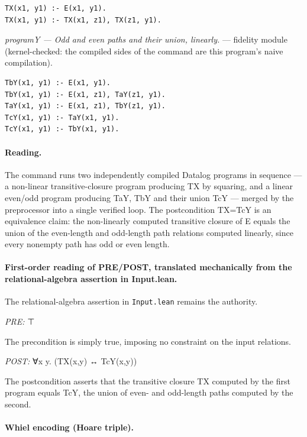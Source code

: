 \documentclass[10pt]{article}
\begin{document}
\begin{Verbatim}[fontsize=\scriptsize,breaklines=true,breakanywhere=true,frame=single,framesep=1.5mm]
TX(x1, y1) :- E(x1, y1).
TX(x1, y1) :- TX(x1, z1), TX(z1, y1).
\end{Verbatim}

{\raggedright\textit{programY --- Odd and even paths and their union, linearly.} --- fidelity module (kernel-checked: the compiled sides of the command are this program's naive compilation).\par}

\begin{Verbatim}[fontsize=\scriptsize,breaklines=true,breakanywhere=true,frame=single,framesep=1.5mm]
TbY(x1, y1) :- E(x1, y1).
TbY(x1, y1) :- E(x1, z1), TaY(z1, y1).
TaY(x1, y1) :- E(x1, z1), TbY(z1, y1).
TcY(x1, y1) :- TaY(x1, y1).
TcY(x1, y1) :- TbY(x1, y1).
\end{Verbatim}

\paragraph{Reading.} The command runs two independently compiled Datalog programs in sequence --- a non-linear transitive-closure program producing TX by squaring, and a linear even/odd program producing TaY, TbY and their union TcY --- merged by the preprocessor into a single verified loop. The postcondition TX=TcY is an equivalence claim: the non-linearly computed transitive closure of E equals the union of the even-length and odd-length path relations computed linearly, since every nonempty path has odd or even length.

\paragraph{First-order reading of PRE/POST, translated mechanically from the relational-algebra assertion in Input.lean.} The relational-algebra assertion in \texttt{Input.lean} remains the authority.

\textit{PRE:} ⊤\par The precondition is simply true, imposing no constraint on the input relations.

\textit{POST:} ∀x y. (TX(x,y) ↔ TcY(x,y))\par The postcondition asserts that the transitive closure TX computed by the first program equals TcY, the union of even- and odd-length paths computed by the second.

\paragraph{Whiel encoding (Hoare triple).}
\end{document}
